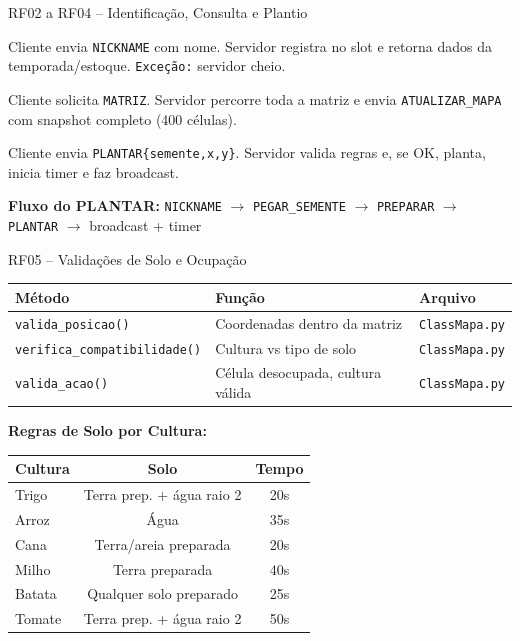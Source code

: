 \documentclass[aspectratio=169]{beamer}
\begin{document}
\begin{frame}{RF02 a RF04 -- Identifica\c{c}\~ao, Consulta e Plantio}
  \begin{description}[RF04 - Plantar]
    \item[RF02 - NICKNAME] Cliente envia \texttt{NICKNAME} com nome. Servidor registra no slot e retorna dados da temporada/estoque. \texttt{Exce\c{c}\~ao:} servidor cheio.
    \item[RF03 - MATRIZ] Cliente solicita \texttt{MATRIZ}. Servidor percorre toda a matriz e envia \texttt{ATUALIZAR\_MAPA} com snapshot completo (400 c\'elulas).
    \item[RF04 - PLANTAR] Cliente envia \texttt{PLANTAR\{semente,x,y\}}. Servidor valida regras e, se OK, planta, inicia timer e faz broadcast.
  \end{description}
  \vfill
  \textbf{Fluxo do PLANTAR:}
  \texttt{NICKNAME} $\rightarrow$ \texttt{PEGAR\_SEMENTE} $\rightarrow$ \texttt{PREPARAR} $\rightarrow$ \texttt{PLANTAR} $\rightarrow$ broadcast + timer
\end{frame}

\begin{frame}{RF05 -- Valida\c{c}\~oes de Solo e Ocupa\c{c}\~ao}
  \footnotesize
  \begin{tabular}{lll}
    \toprule
    \textbf{M\'etodo} & \textbf{Fun\c{c}\~ao} & \textbf{Arquivo} \\
    \midrule
    \texttt{valida\_posicao()} & Coordenadas dentro da matriz & \texttt{ClassMapa.py} \\
    \texttt{verifica\_compatibilidade()} & Cultura vs tipo de solo & \texttt{ClassMapa.py} \\
    \texttt{valida\_acao()} & C\'elula desocupada, cultura v\'alida & \texttt{ClassMapa.py} \\
    \bottomrule
  \end{tabular}

  \vfill
  \textbf{Regras de Solo por Cultura:}
  \footnotesize
  \begin{tabular}{lcc}
    \toprule
    \textbf{Cultura} & \textbf{Solo} & \textbf{Tempo} \\
    \midrule
    Trigo  & Terra prep. + \'agua raio 2 & 20s \\
    Arroz  & \'Agua & 35s \\
    Cana   & Terra/areia preparada & 20s \\
    Milho  & Terra preparada & 40s \\
    Batata & Qualquer solo preparado & 25s \\
    Tomate & Terra prep. + \'agua raio 2 & 50s \\
    \bottomrule
  \end{tabular}
\end{frame}
\end{document}
